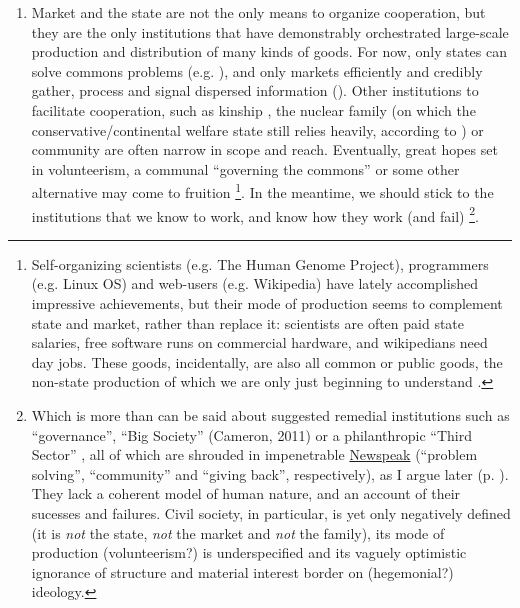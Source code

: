 \documentclass[11pt,a4paper,oneside,openright]{article}
\begin{document}
\begin{enumerate}
	\begin{enumerate} 
		\item Market and the state are not the only means to organize cooperation, but they are the only institutions that have demonstrably orchestrated large-scale production and distribution of many kinds of goods. 
		For now, only states can solve commons problems (e.g. \citealt{Hardin-1968-aa}), and only markets efficiently and credibly gather, process and signal dispersed information (\citealt{Hayek1931}). 
		Other institutions to facilitate cooperation, such as kinship \citep{Van-den-Berghe-1981-aa,Hammond2006}, the nuclear family (on which the conservative/continental welfare state still relies heavily, according to \citealt{Esping-Andersen-1990-aa}) or community \citep{Ostrom1990} are often narrow in scope and reach. 
		Eventually, great hopes set in volunteerism, a communal ``governing the commons'' \citep{Ostrom1990} or some other alternative may come to fruition
		\footnote{
			Self-organizing scientists (e.g. The Human Genome Project), programmers (e.g. Linux OS) and web-users (e.g. Wikipedia) have lately accomplished impressive achievements, but their mode of production seems to complement state and market, rather than replace it: 
			scientists are often paid state salaries, free software runs on commercial hardware, and wikipedians need day jobs. 
			These goods, incidentally, are also all common or public goods, the non-state production of which we are only just beginning to understand \citep{Ostrom1990}.
		}. 
		In the meantime, we should stick to the institutions that we know to work, and know how they work (and fail)
			\footnote{
				Which is more than can be said about suggested remedial institutions such as ``governance'', ``Big Society'' (Cameron, 2011) or a philanthropic ``Third Sector'' \citep{Anheier2002}, all of which are shrouded in impenetrable \hyperref[sec:newspeak]{Newspeak} (``problem solving'', ``community'' and ``giving back'', respectively), as I argue later (p. \pageref{sec:newspeak}). 
				They lack a coherent model of human nature, and an account of their sucesses and failures. Civil society, in particular, is yet only negatively defined (it is \emph{not} the state, \emph{not} the market and \emph{not} the family), its mode of production (volunteerism?) is underspecified and its vaguely optimistic ignorance of structure and material interest border on (hegemonial?) ideology.
			}.
			

\end{enumerate}
\end{enumerate}
\end{document}
